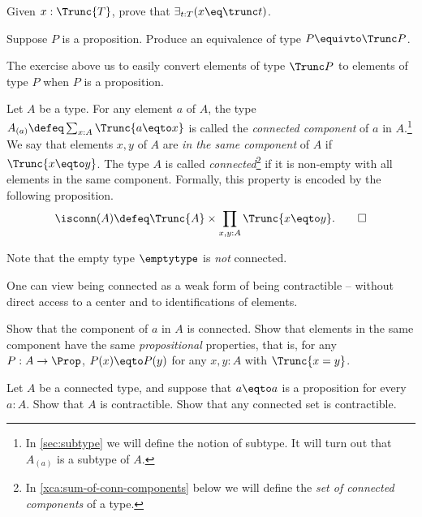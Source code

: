 \begin{xca}
  Given $x:\Trunc{T}$, prove that $\exists_{t:T} ( x \eq \trunc t )$.
\end{xca}

\begin{xca}\label{xca:prop-trivia-1}
  Suppose $P$ is a proposition.  Produce an equivalence of type $P \equivto \Trunc P$.
\end{xca}

The exercise above us to easily convert elements of type $\Trunc P$ to elements of type
$P$ when $P$ is a proposition.

\begin{definition}\label{def:connected}
  Let $A$ be a type. For any element $a$ of $A$, the type
   $A_{(a)}\defeq \sum_{x:A} \Trunc { a \eqto x } $
  is called the \emph{connected component} of $a$ in $A$.\footnote{%
  In \cref{sec:subtype} we will define the notion of subtype.
  It will turn out that $A_{(a)}$ is a subtype of $A$.}
  We say that elements $x,y$ of $A$ are \emph{in the same component}
  of $A$ if $\Trunc { x \eqto y }$. %
  The type $A$ is called \emph{connected}\footnote{%
    In \cref{xca:sum-of-conn-components} below we will
    define the \emph{set of connected components} of a type.}
  if it is non-empty with
  all elements in the same component.  Formally, this property is encoded by the following proposition.
  \[
    \isconn(A) \defeq \Trunc{A} \times \prod_{x,y:A} \Trunc { x \eqto y }.\qedhere
  \]
\end{definition}

Note that the empty type $\emptytype$ is \emph{not} connected.

One can view being connected as a weak form
of being contractible -- without direct access to a center and to
identifications of elements.

\begin{xca}\label{xca:component-connected}
  Show that the component of $a$ in $A$ is connected.
  Show that elements in the same component have the same
  \emph{propositional} properties, that is,
  for any $P:A\to\Prop$, $P(x)\eqto P(y)$
  for any $x,y:A$ with $\Trunc {x=y}$.
\end{xca}

\begin{xca}\label{xca:connected-trivia}
Let $A$ be a connected type, and suppose that $a \eqto a$ is a proposition for every $a:A$. Show that $A$ is contractible.
Show that any connected set is contractible.
\end{xca}

